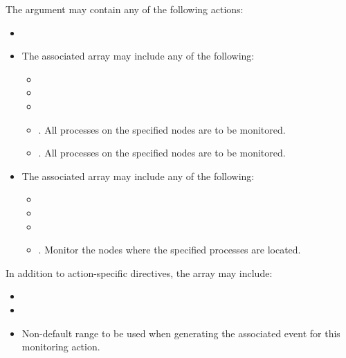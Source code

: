 \optattrstart
The  argument may contain any of the following actions:

\begin{itemize}
    \item {}
    \item {} The associated  array may include any of the following:
    \begin{itemize}
        \item {}
        \item {}
        \item {}
        \item {}. All processes on the specified nodes are to be monitored.
        \item {}. All processes on the specified nodes are to be monitored.
    \end{itemize}
    \item {} The associated  array may include any of the following:
    \begin{itemize}
        \item {}
        \item {}
        \item {}
        \item {}. Monitor the nodes where the specified processes are located.
    \end{itemize}
\end{itemize}

In addition to action-specific directives, the  array may include:

\begin{itemize}
    \item {}
    \item {}
    \item {} Non-default range to be used when generating the associated event for this monitoring action.
\end{itemize}
\optattrend

\descr

